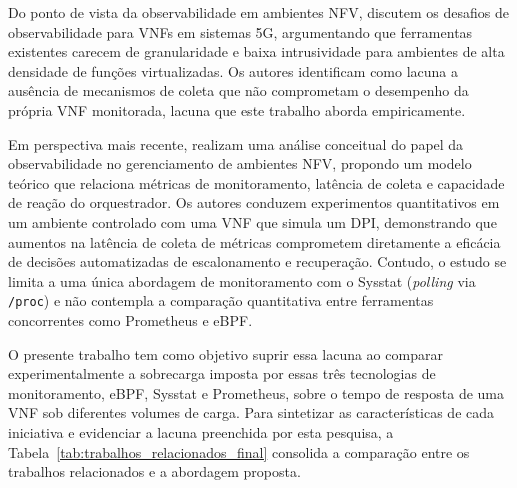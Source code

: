 Do ponto de vista da observabilidade em ambientes NFV,  discutem os desafios de observabilidade para VNFs em sistemas 5G, argumentando que ferramentas existentes carecem de granularidade e baixa intrusividade para ambientes de alta densidade de funções virtualizadas. Os autores identificam como lacuna a ausência de mecanismos de coleta que não comprometam o desempenho da própria VNF monitorada, lacuna que este trabalho aborda empiricamente.

Em perspectiva mais recente,  realizam uma análise conceitual do papel da observabilidade no gerenciamento de ambientes NFV, propondo um modelo teórico que relaciona métricas de monitoramento, latência de coleta e capacidade de reação do orquestrador. Os autores conduzem experimentos quantitativos em um ambiente controlado com uma VNF que simula um DPI, demonstrando que aumentos na latência de coleta de métricas comprometem diretamente a eficácia de decisões automatizadas de escalonamento e recuperação. Contudo, o estudo se limita a uma única abordagem de monitoramento com o Sysstat (\textit{polling} via \texttt{/proc}) e não contempla a comparação quantitativa entre ferramentas concorrentes como Prometheus e eBPF.


O presente trabalho tem como objetivo suprir essa lacuna ao comparar experimentalmente a sobrecarga imposta por essas três tecnologias de monitoramento, eBPF, Sysstat e Prometheus, sobre o tempo de resposta de uma VNF sob diferentes volumes de carga. Para sintetizar as características de cada iniciativa e evidenciar a lacuna preenchida por esta pesquisa, a Tabela~\ref{tab:trabalhos_relacionados_final} consolida a comparação entre os trabalhos relacionados e a abordagem proposta.

